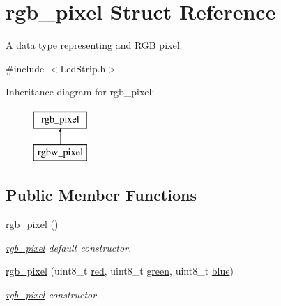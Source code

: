 \hypertarget{structrgb__pixel}{}\section{rgb\+\_\+pixel Struct Reference}
\label{structrgb__pixel}


A data type representing and R\+GB pixel.  




{\ttfamily \#include $<$Led\+Strip.\+h$>$}

Inheritance diagram for rgb\+\_\+pixel\+:\begin{figure}[H]
\begin{center}
\leavevmode
\includegraphics[height=2.000000cm]{structrgb__pixel}
\end{center}
\end{figure}
\subsection*{Public Member Functions}
\begin{DoxyCompactItemize}
\item 
\mbox{\hyperlink{structrgb__pixel_a0acc78a99bc3cac42057cb2d06945124}{rgb\+\_\+pixel}} ()
\begin{DoxyCompactList}\small\item\em \mbox{\hyperlink{structrgb__pixel}{rgb\+\_\+pixel}} default constructor. \end{DoxyCompactList}\item 
\mbox{\hyperlink{structrgb__pixel_a31b7f15eff4be382685b585480fc633a}{rgb\+\_\+pixel}} (uint8\+\_\+t \mbox{\hyperlink{structrgb__pixel_a1f2df0e809c6ae17e69a61ab9bf75a19}{red}}, uint8\+\_\+t \mbox{\hyperlink{structrgb__pixel_a48581a68a54cd5d7c2e9ebffc67c984b}{green}}, uint8\+\_\+t \mbox{\hyperlink{structrgb__pixel_aefc328d7500bdd757c22392610e4d3d0}{blue}})
\begin{DoxyCompactList}\small\item\em \mbox{\hyperlink{structrgb__pixel}{rgb\+\_\+pixel}} constructor. \end{DoxyCompactList}\end{DoxyCompactItemize}
